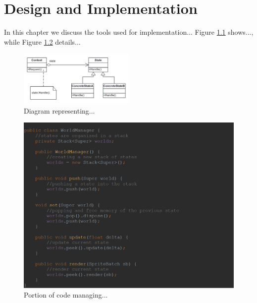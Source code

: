 \chapter{Design and Implementation}\label{c:design}

In this chapter we discuss the tools used for implementation... Figure \ref{fig:uml01} shows..., while Figure \ref{fig:code01} details...

\begin{figure}
\begin{center}
\includegraphics[width=0.5\textwidth]{_images/UML01.png}
\end{center}
\caption{Diagram representing...}
\label{fig:uml01}
\end{figure}


\begin{figure}
\includegraphics[width=1.0\textwidth]{_images/CODE01.png}
\caption{Portion of code managing...}
\label{fig:code01}
\end{figure}

